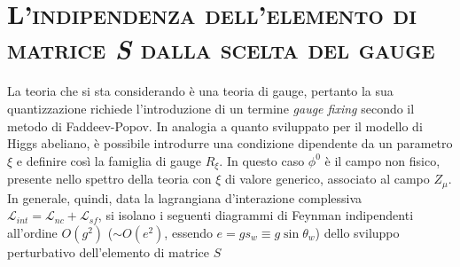 \documentclass[11pt]{article}
\begin{document}
    \section{\centering\textsc{L'indipendenza dell'elemento di matrice \textit{S} dalla scelta del gauge} } %
    La teoria che si sta considerando è una teoria di gauge, pertanto la sua quantizzazione richiede l'introduzione di un termine \textit{gauge fixing} secondo il metodo di Faddeev-Popov. In analogia a quanto sviluppato per il modello di Higgs abeliano,
    è possibile introdurre una condizione dipendente da un parametro $\xi$ e definire così la famiglia di gauge $R_\xi$. In questo caso $\phi^0$ è il campo non fisico, presente nello spettro della teoria con $\xi$ di valore generico, associato al campo $Z_\mu$.
    In generale, quindi, data la lagrangiana d'interazione complessiva $\mathcal{L}_{int}=\mathcal{L}_{nc}+\mathcal{L}_{sf}$, si isolano i seguenti diagrammi di Feynman indipendenti all'ordine $O(g^2)$ ($\sim O(e^2)$, essendo $e=gs_w\equiv g\sin\theta_w$) dello sviluppo perturbativo
    dell'elemento di matrice $S$
\end{document}
